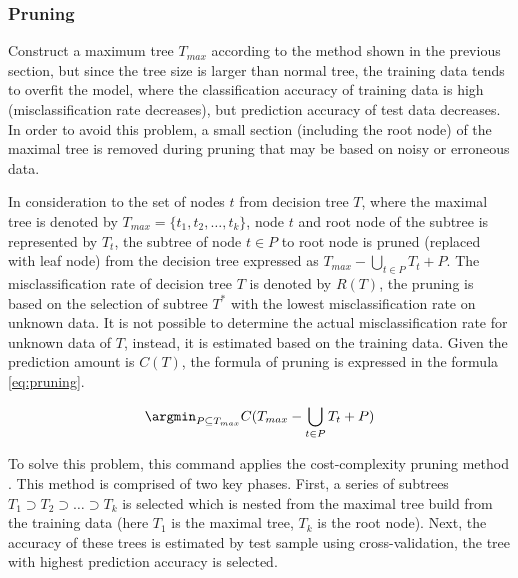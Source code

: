 \subsubsection{Pruning}
Construct a maximum tree $T_{max}$ according to the method shown in the previous section, but since  the tree size is larger than normal tree, the training data tends to overfit the model, where the classification accuracy of training data is high (misclassification rate decreases), but prediction accuracy of test data decreases. In order to avoid this problem, a small section (including the root node) of the maximal tree is removed during pruning that may be based on noisy or erroneous data. 

In consideration to the set of nodes $t$ from decision tree $T$, where the maximal tree is denoted by $T_{max}=\{t_1,t_2,\dots,t_k\}$, node $t$ and root node of the subtree  is represented by $T_t$, the subtree of node $t\in P$ to root node is pruned (replaced with leaf node) from the decision tree expressed as $T_{max}-\bigcup_{t\in P} T_t + P$. The misclassification rate of decision tree $T$ is denoted by $R(T)$, the pruning is based on the selection of subtree $T^*$ with the lowest misclassification rate on unknown data. It is not possible to determine the actual misclassification rate for unknown data of $T$, instead, it is estimated based on the training data. Given the prediction amount is $C(T)$, the formula of pruning is expressed in the formula \ref{eq:pruning}. 


\begin{equation}
\argmin_{P\subseteq T_{max}} C(T_{max}-\bigcup_{t\in P} T_{t} + P)
\label{eq:pruning}
\end{equation}

To solve this problem, this command applies the cost-complexity pruning method \cite{Breiman84}. This method is comprised of two key phases. First, a series of subtrees $T_1 \supset T_2 \supset \dots \supset T_k$ is selected which is nested from the maximal tree build from the training data (here $T_1$ is the maximal tree, $T_k$ is the root node). Next, the accuracy of these trees is estimated by test sample using cross-validation, the tree with highest prediction accuracy is selected.  


